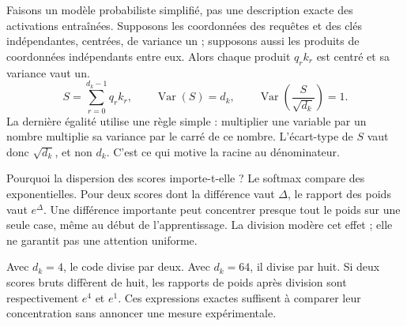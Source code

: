 



Faisons un modèle probabiliste simplifié, pas une description exacte des activations entraînées. Supposons les coordonnées des requêtes et des clés indépendantes, centrées, de variance un ; supposons aussi les produits de coordonnées indépendants entre eux. Alors chaque produit $q_rk_r$ est centré et sa variance vaut un.
\[
 S=\sum_{r=0}^{d_k-1}q_rk_r,\qquad
 \operatorname{Var}(S)=d_k,\qquad
 \operatorname{Var}\!\left(\frac{S}{\sqrt{d_k}}\right)=1.
\]
La dernière égalité utilise une règle simple : multiplier une variable par un nombre multiplie sa variance par le carré de ce nombre. L'écart-type de $S$ vaut donc $\sqrt{d_k}$, et non $d_k$. C'est ce qui motive la racine au dénominateur.

Pourquoi la dispersion des scores importe-t-elle ? Le softmax compare des exponentielles. Pour deux scores dont la différence vaut $\Delta$, le rapport des poids vaut $e^\Delta$. Une différence importante peut concentrer presque tout le poids sur une seule case, même au début de l'apprentissage. La division modère cet effet ; elle ne garantit pas une attention uniforme.

Avec $d_k=4$, le code divise par deux. Avec $d_k=64$, il divise par huit. Si deux scores bruts diffèrent de huit, les rapports de poids après division sont respectivement $e^4$ et $e^1$. Ces expressions exactes suffisent à comparer leur concentration sans annoncer une mesure expérimentale.

